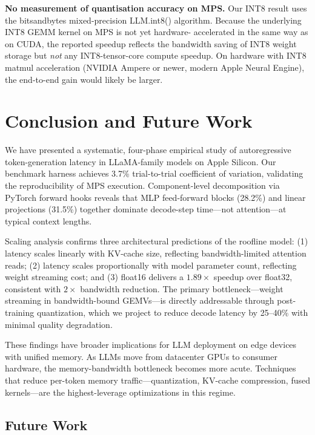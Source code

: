\documentclass[conference]{IEEEtran}
\begin{document}
\textbf{No measurement of quantisation accuracy on MPS.} Our INT8
result uses the bitsandbytes mixed-precision LLM.int8() algorithm.
Because the underlying INT8 GEMM kernel on MPS is not yet hardware-
accelerated in the same way as on CUDA, the reported speedup reflects
the bandwidth saving of INT8 weight storage but \emph{not} any
INT8-tensor-core compute speedup. On hardware with INT8 matmul
acceleration (NVIDIA Ampere or newer, modern Apple Neural Engine), the
end-to-end gain would likely be larger.

\section{Conclusion and Future Work}

We have presented a systematic, four-phase empirical study of
autoregressive token-generation latency in LLaMA-family models on Apple
Silicon. Our benchmark harness achieves 3.7\% trial-to-trial coefficient
of variation, validating the reproducibility of MPS execution.
Component-level decomposition via PyTorch forward hooks reveals that MLP
feed-forward blocks (28.2\%) and linear projections (31.5\%) together
dominate decode-step time---not attention---at typical context lengths.

Scaling analysis confirms three architectural predictions of the roofline
model: (1) latency scales linearly with KV-cache size, reflecting
bandwidth-limited attention reads; (2) latency scales proportionally with
model parameter count, reflecting weight streaming cost; and (3) float16
delivers a $1.89\times$ speedup over float32, consistent with $2\times$
bandwidth reduction. The primary bottleneck---weight streaming in
bandwidth-bound GEMVs---is directly addressable through post-training
quantization, which we project to reduce decode latency by 25--40\% with
minimal quality degradation.

These findings have broader implications for LLM deployment on edge
devices with unified memory. As LLMs move from datacenter GPUs to consumer
hardware, the memory-bandwidth bottleneck becomes more acute. Techniques
that reduce per-token memory traffic---quantization, KV-cache compression,
fused kernels---are the highest-leverage optimizations in this regime.

\subsection{Future Work}
\end{document}
